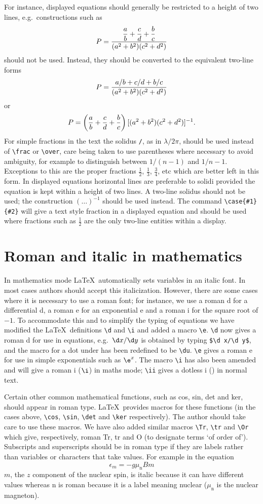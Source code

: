 For instance, displayed equations 
should generally be restricted to a 
height of two lines, e.g.\ constructions such as 
\[ 
P={{\displaystyle{a\over b}+{c\over d}+{b\over c}}\over 
(a^2+b^2)(c^2+d^2)} 
\] 
should not be used. Instead, they should be converted to the 
equivalent two-line forms 
\[ 
P={a/b+c/d+b/c\over (a^2+b^2)(c^2+d^2)} 
\] 
or 
\[
P=\left({a\over b}+{c\over d}+{b\over c}\right)
[(a^2+b^2)(c^2+d^2)]^{-1}. 
\] 
For simple fractions 
in the text the solidus \verb"/", as in 
$\lambda/2\pi$, should be used instead of \verb"\frac" or \verb"\over", care 
being taken to use parentheses where necessary to avoid ambiguity, for 
example to distinguish between $1/(n-1)$ and $1/n-1$. Exceptions to 
this are the proper fractions $\frac12$, $\frac13$, $\frac34$, 
etc which are better left in this form. In displayed equations 
horizontal lines are preferable to solidi provided the equation is 
kept within a height of two lines. A two-line solidus should not be 
used; the construction $(\ldots)^{-1}$ should be used instead.
The command \verb"\case{#1}{#2}" will give a text style fraction in a 
displayed equation and should be used where fractions such as 
$\frac{1}{2}$ are the only two-line entities within a display.

\section{Roman and italic in mathematics}
In mathematics 
mode \LaTeX\ automatically sets variables in an italic 
font. In most cases authors should accept this italicization. However, 
there are some cases where it is necessary to use a roman font; for 
instance, we use a roman d for a differential d, a roman e 
for an exponential e and a roman i for the square root of $-1$. To 
accommodate this and to simplify the typing of equations we have 
modified the \LaTeX\ definitions \verb"\d" and \verb"\i" and added a macro 
\verb"\e". \verb"\d" now gives a roman d for use in equations, e.g.\ $\d x/\d y$ 
is obtained by typing \verb"$\d x/\d y$", and the macro for a dot under has 
been redefined to be \verb"\du". \verb"\e" gives a roman e for use in simple 
exponentials such as $\e^x$. The macro \verb"\i" has also been amended and 
will give a roman i ($\i$) in maths mode; \verb"\ii" gives a dotless i 
(\ii) in normal text.

Certain other common mathematical functions, such as cos, sin, det and 
ker, should appear in roman type. \LaTeX\ provides macros for 
these functions (in the cases above, 
\verb"\cos", \verb"\sin", \verb"\det" and \verb"\ker" 
respectively). The author should take care to use these macros.
We have also added similar macros \verb"\Tr", \verb"\tr" and \verb"\Or" which give, 
respectively, roman Tr, tr and O (to designate terms `of order of').
Subscripts and superscripts should be in roman type if they are labels 
rather than variables or characters that take values. For example in the 
equation
\[
\epsilon_m=-g\mu_{\mathrm n}Bm
\]
$m$, the $z$ component of the nuclear spin, is italic because it can have 
different values whereas n is roman because it 
is a label meaning nuclear ($\mu_{\mathrm n}$ 
is the nuclear magneton).

